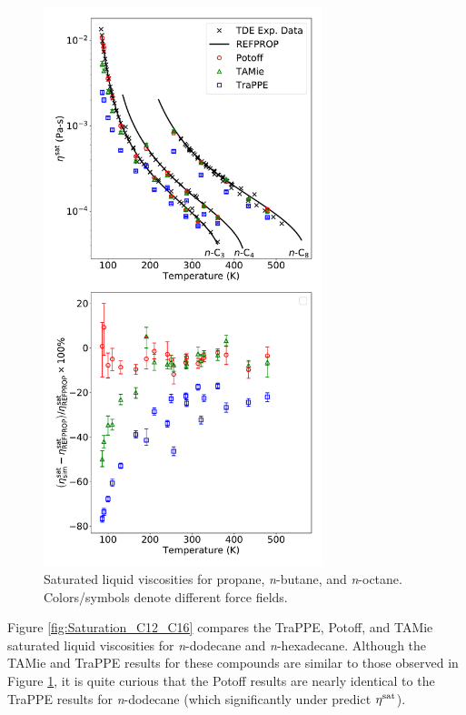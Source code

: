 \documentclass[preprint,review,12pt]{elsarticle}
\begin{document}
	\begin{figure}[htb!]
		\centering
		\includegraphics[width=3.2in]{compare_force_fields_C3_C4_C8.pdf}
		\caption{Saturated liquid viscosities for propane, \textit{n}-butane, and \textit{n}-octane. Colors/symbols denote different force fields.}
		\label{fig:Saturation_C3_C4_C8}
	\end{figure} 
	
	Figure \ref{fig:Saturation_C12_C16} compares the TraPPE, Potoff, and TAMie saturated liquid viscosities for \textit{n}-dodecane and \textit{n}-hexadecane. Although the TAMie and TraPPE results for these compounds are similar to those observed in Figure \ref{fig:Saturation_C3_C4_C8}, it is quite curious that the Potoff results are nearly identical to the TraPPE results for \textit{n}-dodecane (which significantly under predict $\eta^{\rm sat}$). 
	
\end{document}
